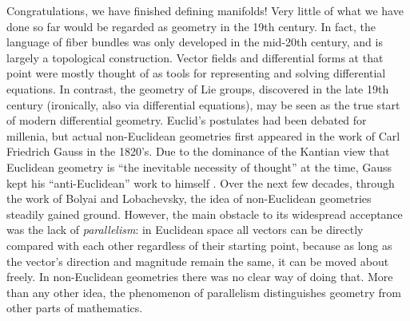 
\begin{hrem*}
    \small
    Congratulations, we have finished defining manifolds! Very little of what we have done so far would be regarded as geometry in the 19th century. In fact, the language of fiber bundles was only developed in the mid-20th century, and is largely a topological construction. Vector fields and differential forms at that point were mostly thought of as tools for representing and solving differential equations. In contrast, the geometry of Lie groups, discovered in the late 19th century (ironically, also via differential equations), may be seen as the true start of modern differential geometry. Euclid's postulates had been debated for millenia, but actual non-Euclidean geometries first appeared in the work of Carl Friedrich Gauss in the 1820's. Due to the dominance of the Kantian view that Euclidean geometry is ``the inevitable necessity of thought'' at the time, Gauss kept his ``anti-Euclidean'' work to himself \cite{Freeman}. Over the next few decades, through the work of Bolyai and Lobachevsky, the idea of non-Euclidean geometries steadily gained ground. However, the main obstacle to its widespread acceptance was the lack of \emph{parallelism}: in Euclidean space all vectors can be directly compared with each other regardless of their starting point, because as long as the vector's direction and magnitude remain the same, it can be moved about freely. In non-Euclidean geometries there was no clear way of doing that. More than any other idea, the phenomenon of parallelism distinguishes geometry from other parts of mathematics.
    

\end{hrem*}
